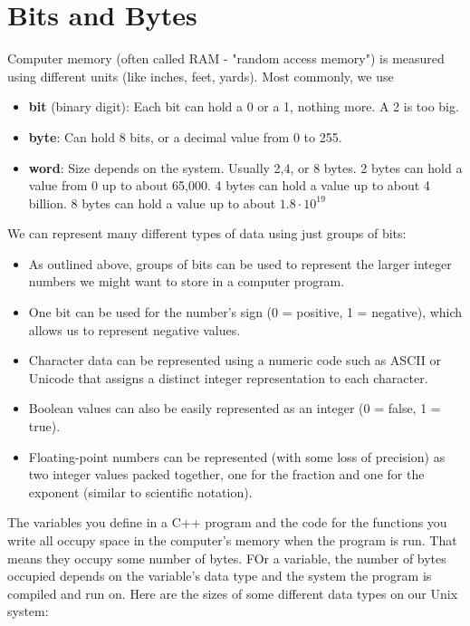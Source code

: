 \documentclass{report}
\begin{document}
\section{Bits and Bytes}
Computer memory (often called RAM - "random access memory") is measured using different units (like inches, feet, yards). Most commonly, we use
\begin{itemize}
  \item \textbf{bit} (binary digit): Each bit can hold a 0 or a 1, nothing more. A 2 is too big.
  \item \textbf{byte}: Can hold 8 bits, or a decimal value from 0 to 255.
  \item \textbf{word}: Size depends on the system. Usually 2,4, or 8 bytes. 2 bytes can hold a value from 0 up to about 65,000. 4 bytes can hold a value up to about 4 billion. 8 bytes can hold a value up to about $1.8 \cdot 10^{19}$
\end{itemize}
\clearpage
\noindent We can represent many different types of data using just groups of bits:
\begin{itemize}
  \item As outlined above, groups of bits can be used to represent the larger integer numbers we might want to store in a computer program. 
  \item One bit can be used for the number's sign (0 = positive, 1 = negative), which allows us to represent negative values.
  \item Character data can be represented using a numeric code such as ASCII or Unicode that assigns a distinct integer representation to each character.
  \item Boolean values can also be easily represented as an integer (0 = false, 1 = true).
  \item Floating-point numbers can be represented (with some loss of precision) as two integer values packed together, one for the fraction and one for the exponent (similar to scientific notation).
\end{itemize}
\bigbreak \noindent
The variables you define in a C++ program and the code for the functions you write all occupy space in the computer's memory when the program is run. That means they occupy some number of bytes. FOr a variable, the number of bytes occupied depends on the variable's data type and the system the program is compiled and run on. Here are the sizes of some different data types on our Unix system:
\end{document}
